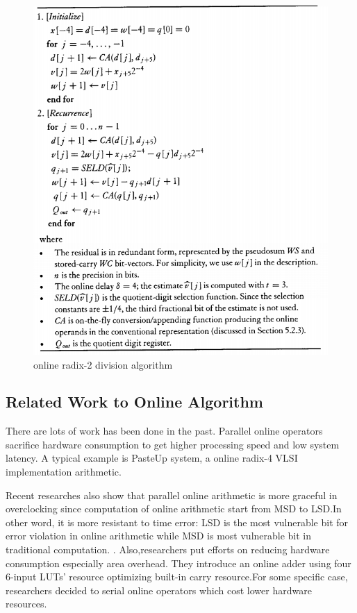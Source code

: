 \documentclass[10pt]{article}
\begin{document}
    \begin{figure}[H]
       \centering
       \includegraphics[scale=0.5]{divide_2_algo.PNG}
       \caption{online radix-2 division algorithm}
    \end{figure}


\subsection{Related Work to Online Algorithm}
There are lots of work has been done in the past. Parallel online operators  sacrifice hardware consumption to get higher processing speed and low system latency. A typical example is PasteUp system, a online radix-4 VLSI implementation arithmetic.\cite{c8}\cite{c9}
    
Recent researches also show that parallel online arithmetic is more graceful in overclocking since computation of online arithmetic start from MSD to LSD.In other word, it is more resistant to time error: LSD is the most vulnerable bit for error violation in online arithmetic while MSD is most vulnerable bit in traditional computation. \cite{c10}. Also,researchers put efforts on reducing hardware consumption especially area overhead. They introduce an online adder using four 6-input LUTs' resource optimizing built-in carry resource\cite{c10}.For some specific case, researchers decided to serial online operators which cost lower hardware resources. 
\end{document}
